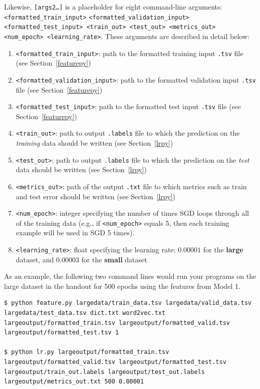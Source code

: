 \documentclass[11pt,addpoints,answers]{exam}
\begin{document}
Likewise, \texttt{[args2\dots]} is a placeholder for eight command-line arguments: \texttt{<formatted\_train\_input>} \texttt{<formatted\_validation\_input> <formatted\_test\_input> <train\_out> <test\_out> <metrics\_out> <num\_epoch> <learning\_rate>}. These arguments are described in detail below:
\begin{enumerate}
    \item \texttt{<formatted\_train\_input>}: path to the formatted training input \texttt{.tsv} file (see Section~\ref{featurepy})
    \item \texttt{<formatted\_validation\_input>}: path to the formatted validation input \texttt{.tsv} file (see Section~\ref{featurepy})
    \item \texttt{<formatted\_test\_input>}: path to the formatted test input \texttt{.tsv} file (see Section~\ref{featurepy})
    \item \texttt{<train\_out>}: path to output \texttt{.labels} file to which the prediction on the \emph{training} data should be written (see Section~\ref{lrpy})
    \item \texttt{<test\_out>}: path to output \texttt{.labels} file to which the prediction on the \emph{test} data should be written (see Section~\ref{lrpy})
    \item \texttt{<metrics\_out>}: path of the output \texttt{.txt} file to which metrics such as train and test error should be written (see Section~\ref{lrpy})
    \item \texttt{<num\_epoch>}: integer specifying the number of times SGD loops through all of the training data (e.g., if \texttt{<num\_epoch>} equals 5, then each training example will be used in SGD 5 times). 
    \item \texttt{<learning\_rate>}: float specifying the learning rate; $0.00001$ for the \textbf{large} dataset, and $0.00003$ for the \textbf{small} dataset
\end{enumerate}

As an example, the following two command lines would run your programs on the large dataset in the handout for 500 epochs using the features from Model 1.

\begin{lstlisting}[language=Shell]
$ python feature.py largedata/train_data.tsv largedata/valid_data.tsv
largedata/test_data.tsv dict.txt word2vec.txt 
largeoutput/formatted_train.tsv largeoutput/formatted_valid.tsv 
largeoutput/formatted_test.tsv 1

$ python lr.py largeoutput/formatted_train.tsv 
largeoutput/formatted_valid.tsv largeoutput/formatted_test.tsv 
largeoutput/train_out.labels largeoutput/test_out.labels 
largeoutput/metrics_out.txt 500 0.00001
\end{lstlisting}
\end{document}
